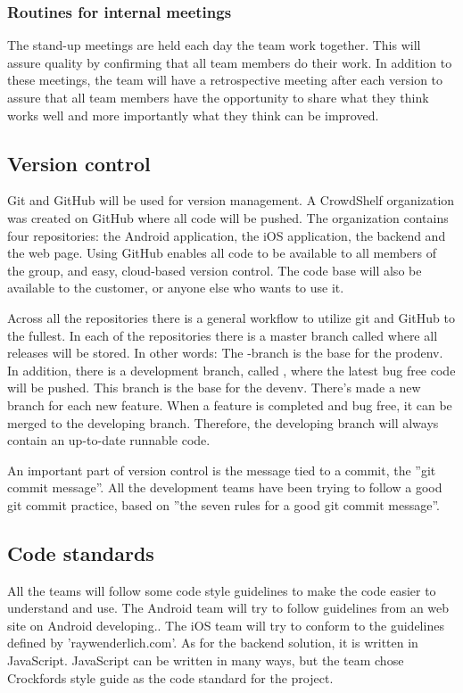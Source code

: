 \subsubsection{Routines for internal meetings}
 The stand-up meetings are held each day the team work together. This will assure quality by confirming that all team members do their work. In addition to these meetings, the team will have a retrospective meeting after each version to assure that all team members have the opportunity to share what they think works well and more importantly what they think can be improved.
   		  

\subsection{Version control}
Git and GitHub will be used for version management.\cite{git-hub} A CrowdShelf organization was created on GitHub where all code will be pushed. The organization contains four repositories: the Android application, the iOS application, the backend and the web page. Using GitHub enables all code to  be available to all members of the group, and easy, cloud-based version control. The code base will also be available to the customer, or anyone else who wants to use it.

Across all the repositories there is a general workflow to utilize git and GitHub to the fullest. In each of the repositories there is a master \gls{branch} called  where all releases will be stored. In other words: The -\gls{branch} is the base for the \gls{prodenv}. In addition, there is a development \gls{branch}, called , where the latest bug free code will be pushed. This \gls{branch} is the base for the \gls{devenv}. There's made a new \gls{branch} for each new feature. When a feature is completed and bug free, it can be merged to the developing \gls{branch}. Therefore, the developing \gls{branch} will always contain an up-to-date runnable code.

An important part of version control is the message tied to a commit, the ''git commit message''. All the development teams have been trying to follow a good git commit practice, based on ''the seven rules for a good git commit message''.\cite{git-commit}

\subsection{Code standards}
All the teams will follow some code style guidelines to make the code easier to understand and use. The Android team will try to follow guidelines from an web site on Android developing.\cite{android-standard}. The iOS team will try to conform to the guidelines defined by 'raywenderlich.com'.\cite{ios-standard} As for the backend solution, it is written in JavaScript. JavaScript can be written in many ways, but the team chose Crockfords style guide as the code standard for the project.\cite{crockford}


